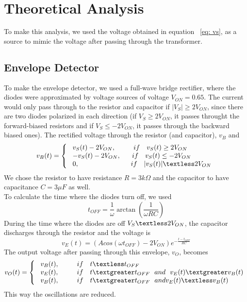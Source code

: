 \section{Theoretical Analysis}
\label{sec:theo}
To make this analysis, we used the voltage obtained in equation ~\eqref{eq: vs}, as a source to mimic the voltage after passing through the transformer. 
\subsection{Envelope Detector}
To make the envelope detector, we used a full-wave bridge rectifier, where the diodes were approximated by voltage sources of voltage $V_{ON}=0.65$. The current would only pass through to the resistor and capacitor if $|V_S| \geq 2V_{ON}$, since there are two diodes polarized in each direction (if $V_S\geq 2V_{ON}$, it passes throught the forward-biased resistors and if $V_S \leq -2V_{ON}$, it passes through the backward biased ones). The rectified voltage through the resistor (and capacitor), $v_B$ and
\begin{equation}
    \begin{split}
{v_B (t)} = \left\{\begin{array}{lll} \ v_S(t) -2V_{ON},  \quad \ \ \ \ \  if \ \  \ v_S(t) \geq 2V_{ON} \\ 
 \ -v_S(t) -2V_{ON} , \quad \ \  if \ \ \ v_S(t) \leq -2V_{ON}\\
 \ 0,\quad \ \ \ \ \ \ \ \ \ \ \ \ \ \ \ \ \ \ \ \  if \ \  \ |v_S(t)|\textless 2V_{ON}\\
 \end{array} \right.
  \end{split}
\end{equation}
 We chose the resistor to have resistance $R=3k\Omega$ and the capacitor to have capacitance $C=3\mu F$ as well.\\
 To calculate the time where the diodes turn off, we used
 \begin{equation}
     t_{OFF}=\frac{1}{\omega}\arctan\left(\frac{1}{\omega RC}\right)
 \end{equation}
 During the time where the diodes are off $V_S \textless 2V_{ON}$, the capacitor discharges through the resistor and the voltage is
 \begin{equation}
     v_E(t)=(Acos(\omega t_{OFF})-2V_{ON})e^{-\frac{t-t_{OFF}}{RC}}
 \end{equation}
 The output voltage after passing through this envelope, $v_O$, becomes
 \begin{equation}
    \begin{split}
{v_O (t)} = \left\{\begin{array}{lll} \ v_B(t),  \quad \ \ \ \ \  if \ \  \ t \textless t_{OFF} \\ 
 \ v_E(t) , \quad \ \ \ \ \  if \   \ \ t \textgreater t_{OFF}\ \ and \ \ v_E(t)\textgreater v_B(t)\\
 \ v_B(t),\quad \ \ \  \ \  if \ \  \ t \textgreater t_{OFF} \ \ and v_E(t) \textless v_B(t)\\
 \end{array} \right.
  \end{split}
\end{equation}
This way the oscillations are reduced.
